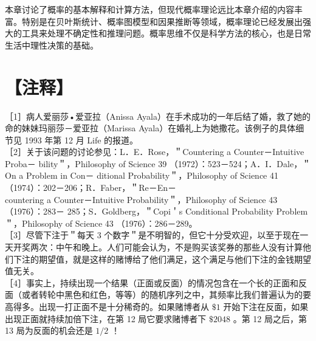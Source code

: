 本章讨论了概率的基本解释和计算方法，但现代概率理论远比本章介绍的内容丰富。特别是在贝叶斯统计、概率图模型和因果推断等领域，概率理论已经发展出强大的工具来处理不确定性和推理问题。概率思维不仅是科学方法的核心，也是日常生活中理性决策的基础。

\section*{【注释】}
［1］病人爱丽莎•爱亚拉（Anissa Ayala）在手术成功的一年后结了婚，救了她的命的妹妹玛丽莎－爱亚拉（Marissa Ayala）在婚礼上为她撒花。该例子的具体细节见 1993 年第 12 月 Life 的报道。\\
［2］关于该问题的讨论参见：L．E．Rose，＂Countering a Counter－Intuitive Proba－ bility＂，Philosophy of Science 39 （1972）：523－524；A．I．Dale，＂On a Problem in Con－ ditional Probability＂，Philosophy of Science 41 （1974）：202－206；R．Faber，＂Re－En－\\
countering a Counter－Intuitive Probability＂，Philosophy of Science 43 （1976）：283－ 285；S．Goldberg，＂Copi＇s Conditional Probability Problem＂，Philosophy of Science 43 （1976）：286－289。\\
［3］尽管下注于＂每天 3 个数字＂是不明智的，但它十分受欢迎，以至于现在一天开奖两次：中午和晚上。人们可能会认为，不是购买该奖券的那些人没有计算他们下注的期望值，就是这样的赌博给了他们满足，这个满足与他们下注的金钱期望值无关。\\
［4］事实上，持续出现一个结果（正面或反面）的情况包含在一个长的正面和反面（或者转轮中黑色和红色，等等）的随机序列之中，其频率比我们普遍认为的要高得多。出现一打正面不是十分稀奇的。如果赌博者从 $\$ 1$ 开始下注在反面，如果出现正面就持续加倍下注，在第 12 局它要求赌博者下 $\$ 2048$ 。第 12 局之后，第 13 局为反面的机会还是 $1 / 2$ ！ 